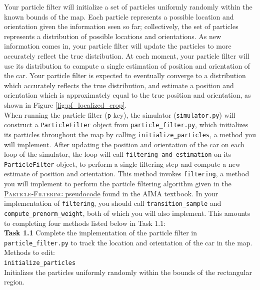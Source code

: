 \documentclass[a4paper]{article}
\begin{document}
Your particle filter will initialize a set of particles uniformly randomly within the known bounds of the map. Each particle represents a possible location and orientation given the information seen so far; collectively, the set of particles represents a distribution of possible locations and orientations. As new information comes in, your particle filter will update the particles to more accurately reflect the true distribution. At each moment, your particle filter will use its distribution to compute a single estimation of position and orientation of the car. Your particle filter is expected to eventually converge to a distribution which accurately reflects the true distribution, and estimate a position and orientation which is approximately equal to the true position and orientation, as shown in Figure \ref{fig:pf_localized_crop}.\\

When running the particle filter (\texttt{p} key), the simulator (\texttt{simulator.py}) will construct a \texttt{ParticleFilter} object from \texttt{particle\_filter.py}, which initializes its particles throughout the map by calling \texttt{initialize\_particles}, a method you will implement. After updating the position and orientation of the car on each loop of the simulator, the loop will call \texttt{filtering\_and\_estimation} on its \texttt{ParticleFilter} object, to perform a single filtering step and compute a new estimate of position and orientation. This method invokes \texttt{filtering}, a method you will implement to perform the particle filtering algorithm given in the \href{https://github.com/aimacode/aima-pseudocode/blob/master/md/Particle-Filtering.md}{\textsc{Particle-Filtering} pseudocode} found in the AIMA textbook. In your implementation of \texttt{filtering}, you should call \texttt{transition\_sample} and \texttt{compute\_prenorm\_weight}, both of which you will also implement. This amounts to completing four methods listed below in Task 1.1:\\

\noindent
\textbf{Task 1.1} Complete the implementation of the particle filter in \texttt{particle\_filter.py} to track the location and orientation of the car in the map. Methods to edit:\\

\indent \texttt{initialize\_particles}\\
\indent Initializes the particles uniformly randomly within the bounds of the rectangular region.\\
\end{document}
